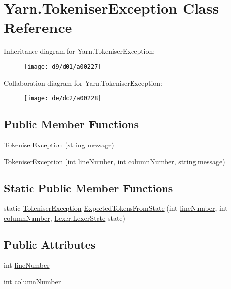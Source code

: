 \hypertarget{a00080}{\section{Yarn.\-Tokeniser\-Exception Class Reference}
\label{a00080}
}


Inheritance diagram for Yarn.\-Tokeniser\-Exception\-:
\nopagebreak
\begin{figure}[H]
\begin{center}
\leavevmode
\texttt{[image: d9/d01/a00227]}
\end{center}
\end{figure}


Collaboration diagram for Yarn.\-Tokeniser\-Exception\-:
\nopagebreak
\begin{figure}[H]
\begin{center}
\leavevmode
\texttt{[image: de/dc2/a00228]}
\end{center}
\end{figure}
\subsection*{Public Member Functions}
\begin{DoxyCompactItemize}
\item 
\hyperlink{a00080_ad00fcf742d2b0d476ce43b27a3f3b6c1}{Tokeniser\-Exception} (string message)
\item 
\hyperlink{a00080_aa8674d006a0d29081a7b87bdd8ff2f4f}{Tokeniser\-Exception} (int \hyperlink{a00080_a54b936d7b4f26f88a07a66c5fc1d1ad1}{line\-Number}, int \hyperlink{a00080_aabf2ad38f3984297c1daede9be55e3d6}{column\-Number}, string message)
\end{DoxyCompactItemize}
\subsection*{Static Public Member Functions}
\begin{DoxyCompactItemize}
\item 
static \hyperlink{a00080}{Tokeniser\-Exception} \hyperlink{a00080_af88cfa5eafdee355e1abb67e358497bd}{Expected\-Tokens\-From\-State} (int \hyperlink{a00080_a54b936d7b4f26f88a07a66c5fc1d1ad1}{line\-Number}, int \hyperlink{a00080_aabf2ad38f3984297c1daede9be55e3d6}{column\-Number}, \hyperlink{a00048}{Lexer.\-Lexer\-State} state)
\end{DoxyCompactItemize}
\subsection*{Public Attributes}
\begin{DoxyCompactItemize}
\item 
int \hyperlink{a00080_a54b936d7b4f26f88a07a66c5fc1d1ad1}{line\-Number}
\item 
int \hyperlink{a00080_aabf2ad38f3984297c1daede9be55e3d6}{column\-Number}
\end{DoxyCompactItemize}


